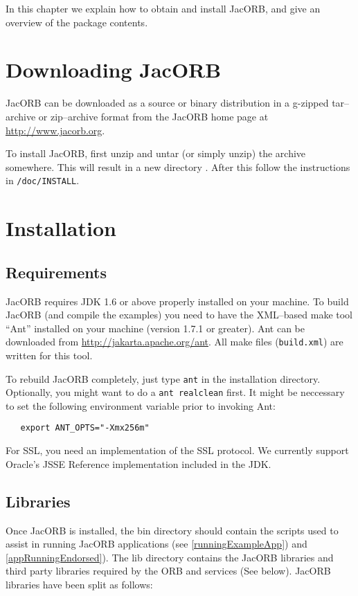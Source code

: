 
In this chapter  we explain how to obtain and  install JacORB, and give
an overview of the package contents.

\section{Downloading JacORB}


JacORB can be downloaded as a source or binary distribution in a
g-zipped tar--archive or zip--archive format from the JacORB home
page at \href{http://www.jacorb.org}{http://www.jacorb.org}.

To install JacORB, first unzip and untar (or simply unzip) the archive
somewhere.  This will result  in a new directory {\tt \JacORBDir}.
After this follow the instructions in {\tt \JacORBDir/doc/INSTALL}.

\section{Installation}
\label{Sec_installation}

\subsection{Requirements}

JacORB requires JDK 1.6 or above properly installed on your machine.  To build
JacORB (and compile the examples) you need to have the XML--based make tool
``Ant'' installed on your machine (version 1.7.1 or greater).  Ant can be downloaded
from \href{http://jakarta.apache.org/ant}{http://jakarta.apache.org/ant}. All make
files ({\tt build.xml}) are written for this tool.

To rebuild JacORB completely, just type {\tt ant} in the installation directory. Optionally,
you might want to do a {\tt ant realclean} first. It might be neccessary to set the following
environment variable prior to invoking Ant:
\small{
\begin{verbatim}
   export ANT_OPTS="-Xmx256m"
\end{verbatim}
}
For SSL, you need an implementation of the SSL protocol. We currently support
Oracle's JSSE Reference implementation included in the JDK.

\subsection{Libraries}
Once JacORB is installed, the bin directory should contain the scripts used to assist in
running JacORB applications (see \ref{runningExampleApp}) and \ref{appRunningEndorsed}).
The lib directory contains the JacORB libraries and third party libraries required by the ORB
and services (See below). JacORB libraries have been split as follows:

